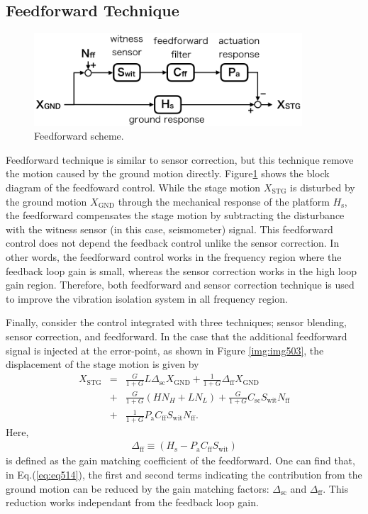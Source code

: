 \subsection{Feedforward Technique}
\begin{figure}[h]
  \begin{center}   
    \includegraphics[width=10cm]{./img_chap5/img506.png}
    \caption{Feedforward scheme.} \label{img:img506}
  \end{center}
\end{figure}
Feedforward technique is similar to sensor correction, but this technique remove the motion caused by the ground motion directly. Figure\ref{img:img506} shows the block diagram of the feedfoward control. While the stage motion $X_{\mathrm{STG}}$ is disturbed by the ground motion $X_{\mathrm{GND}}$ through the mechanical response of the platform $H_{\mathrm{s}}$, the feedforward compensates the stage motion by subtracting the disturbance with the witness sensor (in this case, seismometer) signal. This feedforward control does not depend the feedback control unlike the sensor correction. In other words, the feedforward control works in the frequency region where the feedback loop gain is small, whereas the sensor correction works in the high loop gain region. Therefore, both feedforward and sensor correction technique is used to improve the vibration isolation system in all frequency region.


Finally, consider the control integrated with three techniques; sensor blending, sensor correction, and feedforward. In the case that the additional feedforward signal is injected at the error-point, as shown in Figure \ref{img:img503}, the displacement of the stage motion is given by
\begin{eqnarray}\nonumber
  X_{\mathrm{STG}} &=&\frac{G}{1+G}L\Delta_{\mathrm{sc}} X_{\mathrm{GND}} + \frac{1}{1+G} \Delta_{\mathrm{ff}} X_{\mathrm{GND}}\\ \nonumber
  &+& \frac{G}{1+G}\left(HN_{H}+LN_{L}\right) + \frac{G}{1+G}C_{\mathrm{sc}}S_{\mathrm{wit}}N_{\mathrm{ff}} \\ 
  &+& \frac{1}{1+G}P_{\mathrm{a}} C_{\mathrm{ff}}S_{\mathrm{wit}}N_{\mathrm{ff}} \label{eq:eq514}.
\end{eqnarray}
Here, 
\begin{eqnarray}
  \Delta_{\mathrm{ff}} \equiv \left(H_{\mathrm{s}}-P_{\mathrm{a}}C_{\mathrm{ff}}S_{\mathrm{wit}}\right) \label{eq:eq515}
\end{eqnarray}
is defined as the gain matching coefficient of the feedforward. One can find that, in  Eq.(\ref{eq:eq514}),  the first and second terms indicating the contribution from the ground motion can be reduced by the gain matching factors: $\Delta_{\mathrm{sc}}$ and $\Delta_{\mathrm{ff}}$. This reduction works independant from the feedback loop gain.

